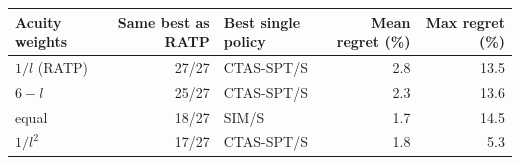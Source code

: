 \begin{tabular}{lrlrr}
\toprule
Acuity weights & Same best as RATP & Best single policy & Mean regret (\%) & Max regret (\%) \\
\midrule
$1/l$ (RATP) & 27/27 & CTAS-SPT/S & 2.8 & 13.5 \\
$6-l$ & 25/27 & CTAS-SPT/S & 2.3 & 13.6 \\
equal & 18/27 & SIM/S & 1.7 & 14.5 \\
$1/l^2$ & 17/27 & CTAS-SPT/S & 1.8 & 5.3 \\
\bottomrule
\end{tabular}